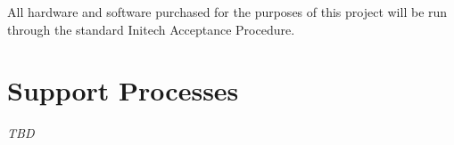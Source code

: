 \documentclass[11pt]{article}
\begin{document}
All hardware and software purchased for the purposes of this project will be run through the
standard Initech Acceptance Procedure.



\section{Support Processes}
\textit{TBD}








\end{document}
